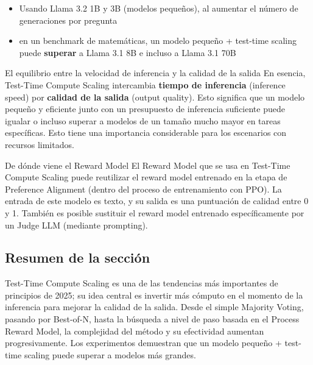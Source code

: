 \begin{itemize}
    \item Usando Llama 3.2 1B y 3B (modelos pequeños), al aumentar el número de generaciones por pregunta
    \item en un benchmark de matemáticas, un modelo pequeño + test-time scaling puede \textbf{superar} a Llama 3.1 8B e incluso a Llama 3.1 70B
\end{itemize}

\begin{importantbox}{El equilibrio entre la velocidad de inferencia y la calidad de la salida}
En esencia, Test-Time Compute Scaling intercambia \textbf{tiempo de inferencia} (inference speed) por \textbf{calidad de la salida} (output quality). Esto significa que un modelo pequeño y eficiente junto con un presupuesto de inferencia suficiente puede igualar o incluso superar a modelos de un tamaño mucho mayor en tareas específicas. Esto tiene una importancia considerable para los escenarios con recursos limitados.
\end{importantbox}

\begin{knowledgebox}{De dónde viene el Reward Model}
El Reward Model que se usa en Test-Time Compute Scaling puede reutilizar el reward model entrenado en la etapa de Preference Alignment (dentro del proceso de entrenamiento con PPO). La entrada de este modelo es texto, y su salida es una puntuación de calidad entre 0 y 1. También es posible sustituir el reward model entrenado específicamente por un Judge LLM (mediante prompting).
\end{knowledgebox}

\subsection{Resumen de la sección}

Test-Time Compute Scaling es una de las tendencias más importantes de principios de 2025; su idea central es invertir más cómputo en el momento de la inferencia para mejorar la calidad de la salida. Desde el simple Majority Voting, pasando por Best-of-N, hasta la búsqueda a nivel de paso basada en el Process Reward Model, la complejidad del método y su efectividad aumentan progresivamente. Los experimentos demuestran que un modelo pequeño + test-time scaling puede superar a modelos más grandes.

\newpage
